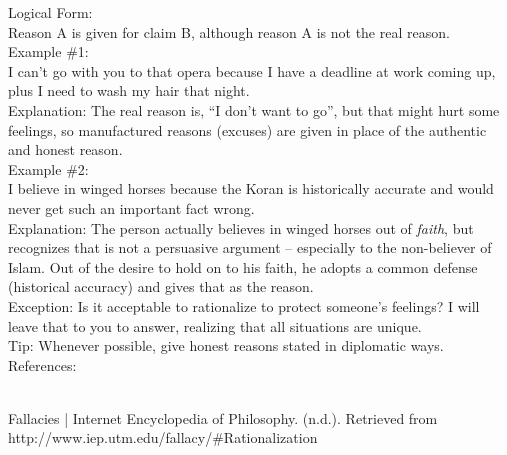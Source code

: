 \documentclass[a4paper,12pt,single,pdftex]{scrartcl}
\begin{document}
    
      Logical Form:
    \\

    
      Reason A is given for claim B, although reason A is not the real reason.
    \\

    
      Example \#1:
    \\

    
      I can’t go with you to that opera because I have a deadline at work coming up, plus I need to wash my hair that night.
    \\

    
      Explanation: The real reason is, “I don’t want to go”, but that might hurt some feelings, so manufactured reasons (excuses) are given in place of the authentic and honest reason.
    \\

    
      Example \#2:
    \\

    
      I believe in winged horses because the Koran is historically accurate and would never get such an important fact wrong.
    \\

    
      Explanation: The person actually believes in winged horses out of {\it faith}, but recognizes that is not a persuasive argument -- especially to the non-believer of Islam.  Out of the desire to hold on to his faith, he adopts a common defense (historical accuracy) and gives that as the reason.
    \\

    
      Exception: Is it acceptable to rationalize to protect someone’s feelings?  I will leave that to you to answer, realizing that all situations are unique.
    \\

    
      Tip: Whenever possible, give honest reasons stated in diplomatic ways.
    \\

    References:

    
      
        
      \\

      
        
          Fallacies | Internet Encyclopedia of Philosophy. (n.d.). Retrieved from http://www.iep.utm.edu/fallacy/\#Rationalization
        
      
    
\end{document}
